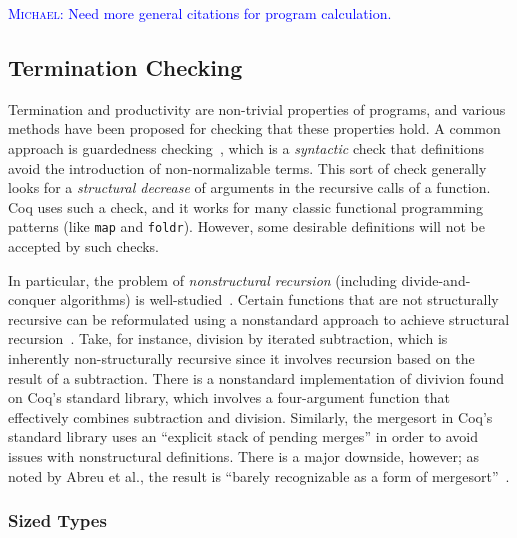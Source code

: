 \documentclass[anonymous, a4paper, UKenglish, cleveref, autoref, thm-restate]{lipics-v2021}
\newcommand{\mvol}[1]{\textcolor{blue}{\textsc{Michael}: #1}}
\newcommand{\haskell}[1]{\texttt{#1}}
\begin{document}
\mvol{Need more general citations for program calculation.}

\subsection{Termination Checking}

Termination and productivity are non-trivial properties of programs, and various
methods have been proposed for checking that these properties hold. A common
approach is guardedness checking~\cite{10.5555/646535.695850}, which is a
\emph{syntactic} check that definitions avoid the introduction of
non-normalizable terms. This sort of check generally looks for a
\emph{structural decrease} of arguments in the recursive calls of a function.
Coq uses such a check, and it works for many classic functional programming
patterns (like \haskell{map} and \haskell{foldr}). However, some desirable
definitions will not be accepted by such checks.

In particular, the problem of \emph{nonstructural recursion} (including
divide-and-conquer algorithms) is well-studied~\cite{BOVE_KRAUSS_SOZEAU_2016}.
Certain functions that are not structurally recursive can be reformulated using
a nonstandard approach to achieve structural recursion~\cite{AbreuDHJMS23}.
Take, for instance, division by iterated subtraction, which is inherently
non-structurally recursive since it involves recursion based on the result of a
subtraction. There is a nonstandard implementation of divivion found on Coq's
standard library, which involves a four-argument function that effectively
combines subtraction and division. Similarly, the mergesort in Coq's standard
library uses an ``explicit stack of pending merges'' in order to avoid issues
with nonstructural definitions. There is a major downside, however; as noted by
Abreu et al., the result is ``barely recognizable as a form of
mergesort''~\cite{AbreuDHJMS23}.

\subsubsection{Sized Types}
\end{document}
